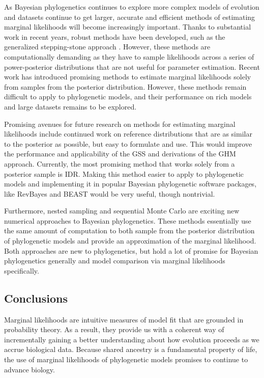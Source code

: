 As Bayesian phylogenetics continues to explore more complex models of evolution
and datasets continue to get larger, accurate and efficient methods of
estimating marginal likelihoods will become increasingly important.
Thanks to substantial work in recent years, robust methods have been developed,
such as the generalized stepping-stone approach \citep{Fan2011}.
However, these methods are computationally demanding as they have to sample
likelihoods across a series of power-posterior distributions that are not
useful for parameter estimation.
Recent work has introduced promising methods to estimate marginal likelihoods
solely from samples from the posterior distribution.
However, these methods remain difficult to apply to phylogenetic models, and
their performance on rich models and large datasets remains to be explored.

Promising avenues for future research on methods for estimating marginal
likelihoods include continued work on reference distributions that are as
similar to the posterior as possible, but easy to formulate and use.
This would improve the performance and applicability of the GSS and derivations
of the GHM approach.
Currently, the most promising method that works solely from a posterior
sample is IDR.
Making this method easier to apply to phylogenetic models and implementing
it in popular Bayesian phylogenetic software packages,
like
RevBayes \citep{Hohna2016}
and
BEAST \citep{Drummond2012,Bouckaert2014}
would be very useful, though nontrivial.

Furthermore, nested sampling and sequential Monte Carlo are exciting new
numerical approaches to Bayesian phylogenetics.
These methods essentially use the same amount of computation to both sample
from the posterior distribution of phylogenetic models and provide an
approximation of the marginal likelihood.
Both approaches are new to phylogenetics, but hold a lot of promise
for Bayesian phylogenetics generally and model comparison via
marginal likelihoods specifically.


\subsection{Conclusions}

Marginal likelihoods are intuitive measures of model fit that are grounded in
probability theory.
As a result, they provide us with a coherent way of incrementally gaining a
better understanding about how evolution proceeds as we accrue biological data.
Because shared ancestry is a fundamental property of life, the use of marginal
likelihoods of phylogenetic models promises to continue to advance biology.
